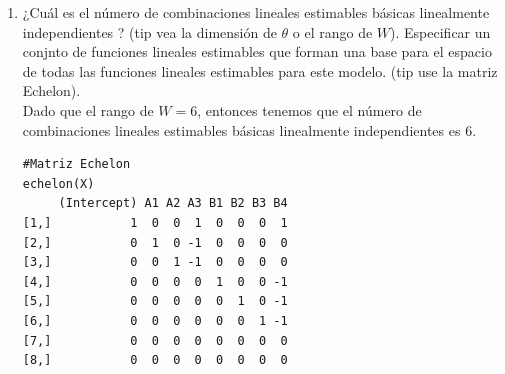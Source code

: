 \documentclass[10pt,a4paper]{report}
\begin{document}
\begin{enumerate}
\[
\begin{bmatrix}
\theta_0 \\ \theta_1 \\ \theta_2 \\ \theta_3 \\ \theta_4 \\ \theta_5
\end{bmatrix}=
\begin{bmatrix}
1 & 1 & 0 & 0 & 1 & 0 & 0 & 0 \\
0 & -1 & 1 & 0 & 0 & 0 & 0 & 0 \\
0 & -1 & 0 & 1 & 0 & 0 & 0 & 0 \\
0 & 0 & 0 & 0 & -1 & 1 & 0 & 0 \\
0 & 0 & 0 & 0 & -1 & 0 & 1 & 0 \\
0 & 0 & 0 & 0 & -1 & 0 & 0 & 1
\end{bmatrix}
\begin{bmatrix}
\mu \\ \alpha_1 \\ \alpha_2 \\ \alpha_3 \\ \beta_1 \\ \beta_2 \\ \beta_3 \\ \beta_4
\end{bmatrix} = 
\begin{bmatrix}
\mu +\alpha_1 + \beta_1\\ \alpha_2 - \alpha_1 \\ \alpha_3 - \alpha_1 \\ \beta_2 - \beta_1 \\ \beta_3 - \beta_1 \\ \beta_4 - \beta_1
\end{bmatrix}
\]
    
 \newpage 

    \item[f)] ¿Cuál es el número de combinaciones lineales estimables básicas linealmente independientes ? (tip vea la dimensión de $\theta$ o el rango de $W$). Especificar un conjnto de funciones lineales estimables que forman una base para el espacio de todas las funciones lineales estimables para este modelo. (tip use la matriz Echelon).\\
 
Dado que el rango de $W=6$, entonces tenemos que el número de combinaciones lineales estimables básicas linealmente independientes es 6.\\

\begin{verbatim}
#Matriz Echelon
echelon(X)
     (Intercept) A1 A2 A3 B1 B2 B3 B4
[1,]           1  0  0  1  0  0  0  1
[2,]           0  1  0 -1  0  0  0  0
[3,]           0  0  1 -1  0  0  0  0
[4,]           0  0  0  0  1  0  0 -1
[5,]           0  0  0  0  0  1  0 -1
[6,]           0  0  0  0  0  0  1 -1
[7,]           0  0  0  0  0  0  0  0
[8,]           0  0  0  0  0  0  0  0
\end{verbatim}


\end{enumerate}
\end{document}
